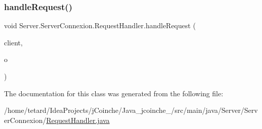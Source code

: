 \subsubsection{\texorpdfstring{handle\+Request()}{handleRequest()}}
{\footnotesize\ttfamily void Server.\+Server\+Connexion.\+Request\+Handler.\+handle\+Request (\begin{DoxyParamCaption}\item[{\mbox{\hyperlink{classServer_1_1ServerConnexion_1_1ClientInfos}{Client\+Infos}}}]{client,  }\item[{Object}]{o }\end{DoxyParamCaption})\hspace{0.3cm}{\ttfamily [inline]}}



The documentation for this class was generated from the following file\+:\begin{DoxyCompactItemize}
\item 
/home/tetard/\+Idea\+Projects/j\+Coinche/\+Java\+\_\+jcoinche\+\_/src/main/java/\+Server/\+Server\+Connexion/\mbox{\hyperlink{RequestHandler_8java}{Request\+Handler.\+java}}\end{DoxyCompactItemize}
